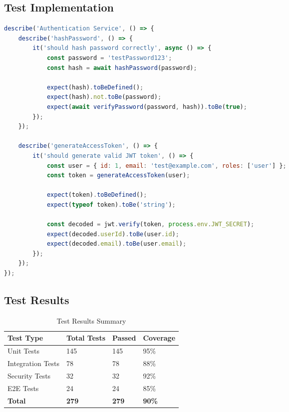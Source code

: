 \documentclass[12pt,a4paper]{article}
\begin{document}
\subsection{Test Implementation}

\begin{lstlisting}[language=JavaScript, caption=Example Unit Test]
describe('Authentication Service', () => {
    describe('hashPassword', () => {
        it('should hash password correctly', async () => {
            const password = 'testPassword123';
            const hash = await hashPassword(password);
            
            expect(hash).toBeDefined();
            expect(hash).not.toBe(password);
            expect(await verifyPassword(password, hash)).toBe(true);
        });
    });
    
    describe('generateAccessToken', () => {
        it('should generate valid JWT token', () => {
            const user = { id: 1, email: 'test@example.com', roles: ['user'] };
            const token = generateAccessToken(user);
            
            expect(token).toBeDefined();
            expect(typeof token).toBe('string');
            
            const decoded = jwt.verify(token, process.env.JWT_SECRET);
            expect(decoded.userId).toBe(user.id);
            expect(decoded.email).toBe(user.email);
        });
    });
});
\end{lstlisting}

\subsection{Test Results}

\begin{table}[H]
    \centering
    \begin{tabular}{|l|l|l|l|}
        \hline
        \textbf{Test Type} & \textbf{Total Tests} & \textbf{Passed} & \textbf{Coverage} \\
        \hline
        Unit Tests & 145 & 145 & 95\% \\
        \hline
        Integration Tests & 78 & 78 & 88\% \\
        \hline
        Security Tests & 32 & 32 & 92\% \\
        \hline
        E2E Tests & 24 & 24 & 85\% \\
        \hline
        \textbf{Total} & \textbf{279} & \textbf{279} & \textbf{90\%} \\
        \hline
    \end{tabular}
    \caption{Test Results Summary}
    \label{tab:test-results}
\end{table}
\end{document}
